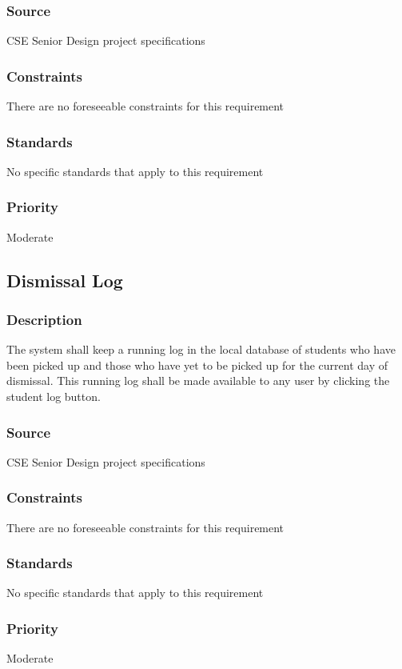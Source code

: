 \subsubsection{Source}
\quad \quad CSE Senior Design project specifications
\subsubsection{Constraints}
\quad \quad There are no foreseeable constraints for this requirement  
\subsubsection{Standards}
\quad \quad No specific standards that apply to this requirement
\subsubsection{Priority}
\quad \quad Moderate

\subsection{Dismissal Log}
\subsubsection{Description}
\quad \quad The system shall keep a running log in the local database of students who have been 
picked up and those who have yet to be picked up for the current day of dismissal. 
This running log shall be made available to any user by clicking the student log 
button. 
\subsubsection{Source}
\quad \quad CSE Senior Design project specifications
\subsubsection{Constraints}
\quad \quad There are no foreseeable constraints for this requirement  
\subsubsection{Standards}
\quad \quad No specific standards that apply to this requirement
\subsubsection{Priority}
\quad \quad Moderate

